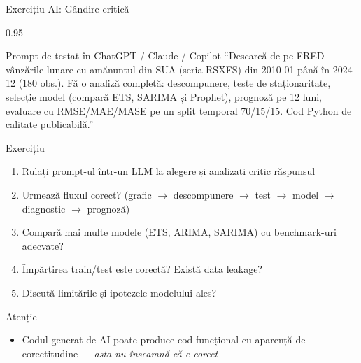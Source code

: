 \documentclass[9pt, aspectratio=169, t]{beamer}
\begin{document}
\begin{frame}{Exercițiu AI: Gândire critică}
    \begin{cminipage}{0.95\textwidth}
        \vspace{-3mm}
        \begin{block}{\footnotesize Prompt de testat în ChatGPT / Claude / Copilot}
            {\scriptsize
            ``Descarcă de pe FRED vânzările lunare cu amănuntul din SUA (seria RSXFS) din 2010-01 până în 2024-12 (180 obs.). Fă o analiză completă: descompunere, teste de staționaritate, selecție model (compară ETS, SARIMA și Prophet), prognoză pe 12 luni, evaluare cu RMSE/MAE/MASE pe un split temporal 70/15/15. Cod Python de calitate publicabilă.''
            }
        \end{block}
        \vspace{-2mm}
        {\scriptsize
        \begin{block}{Exercițiu}
            \begin{enumerate}\setlength{\itemsep}{0pt}
                \item Rulați prompt-ul într-un LLM la alegere și analizați critic răspunsul
                \item Urmează fluxul corect? (grafic $\to$ descompunere $\to$ test $\to$ model $\to$ diagnostic $\to$ prognoză)
                \item Compară mai multe modele (ETS, ARIMA, SARIMA) cu benchmark-uri adecvate?
                \item Împărțirea train/test este corectă? Există data leakage?
                \item Discută limitările și ipotezele modelului ales?
            \end{enumerate}
        \end{block}
        }
        \vspace{-2mm}
        {\footnotesize
        \begin{alertblock}{Atenție}
            \begin{itemize}\setlength{\itemsep}{0pt}
                \item Codul generat de AI poate produce cod funcțional cu aparență de corectitudine --- \textit{asta nu înseamnă că e corect}
            \end{itemize}
        \end{alertblock}
        }
    \end{cminipage}
\end{frame}
\end{document}
